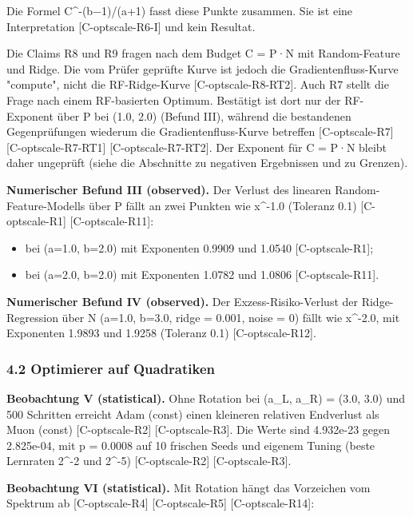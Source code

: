 \documentclass[10pt,twocolumn]{article}
\begin{document}
Die Formel C^-(b−1)/(a+1) fasst diese Punkte zusammen. Sie ist eine Interpretation {\scriptsize[C-optscale-R6-I]} und kein Resultat.

Die Claims R8 und R9 fragen nach dem Budget C = P·N mit Random-Feature und Ridge. Die vom Prüfer geprüfte Kurve ist jedoch die Gradientenfluss-Kurve "compute", nicht die RF-Ridge-Kurve {\scriptsize[C-optscale-R8-RT2]}. Auch R7 stellt die Frage nach einem RF-basierten Optimum. Bestätigt ist dort nur der RF-Exponent über P bei (1.0, 2.0) (Befund III), während die bestandenen Gegenprüfungen wiederum die Gradientenfluss-Kurve betreffen {\scriptsize[C-optscale-R7]} {\scriptsize[C-optscale-R7-RT1]} {\scriptsize[C-optscale-R7-RT2]}. Der Exponent für C = P·N bleibt daher ungeprüft (siehe die Abschnitte zu negativen Ergebnissen und zu Grenzen).

\textbf{Numerischer Befund III (observed).} Der Verlust des linearen Random-Feature-Modells über P fällt an zwei Punkten wie x^-1.0 (Toleranz 0.1) {\scriptsize[C-optscale-R1]} {\scriptsize[C-optscale-R11]}:
\begin{itemize}
\item bei (a=1.0, b=2.0) mit Exponenten 0.9909 und 1.0540 {\scriptsize[C-optscale-R1]};
\item bei (a=2.0, b=2.0) mit Exponenten 1.0782 und 1.0806 {\scriptsize[C-optscale-R11]}.
\end{itemize}

\textbf{Numerischer Befund IV (observed).} Der Exzess-Risiko-Verlust der Ridge-Regression über N (a=1.0, b=3.0, ridge = 0.001, noise = 0) fällt wie x^-2.0, mit Exponenten 1.9893 und 1.9258 (Toleranz 0.1) {\scriptsize[C-optscale-R12]}.

\subsubsection*{4.2 Optimierer auf Quadratiken}

\textbf{Beobachtung V (statistical).} Ohne Rotation bei (a_L, a_R) = (3.0, 3.0) und 500 Schritten erreicht Adam (const) einen kleineren relativen Endverlust als Muon (const) {\scriptsize[C-optscale-R2]} {\scriptsize[C-optscale-R3]}. Die Werte sind 4.932e-23 gegen 2.825e-04, mit p = 0.0008 auf 10 frischen Seeds und eigenem Tuning (beste Lernraten 2^-2 und 2^-5) {\scriptsize[C-optscale-R2]} {\scriptsize[C-optscale-R3]}.

\textbf{Beobachtung VI (statistical).} Mit Rotation hängt das Vorzeichen vom Spektrum ab {\scriptsize[C-optscale-R4]} {\scriptsize[C-optscale-R5]} {\scriptsize[C-optscale-R14]}:
\end{document}
